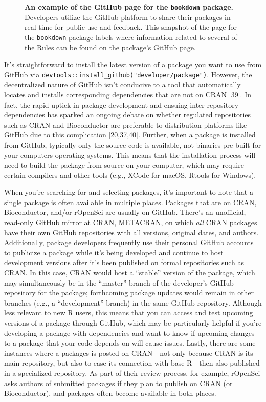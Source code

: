 \documentclass[10pt,letterpaper]{article}
\begin{document}
\begin{figure}[!h]
\caption{{\bf An example of the GitHub page for the \texttt{bookdown} package.}
Developers utilize the GitHub platform to share their packages in real-time for public use and feedback. This snapshot of the page for the \texttt{bookdown} package labels where information related to several of the Rules can be found on the package's GitHub page.}
\label{fig6}
\end{figure}

It's straightforward to install the latest version of a package you want
to use from GitHub via
\texttt{devtools::install\_github("developer/package")}. However, the
decentralized nature of GitHub isn't conducive to a tool that
automatically locates and installs corresponding dependencies that are
not on CRAN {[}39{]}. In fact, the rapid uptick in package development
and ensuing inter-repository dependencies has sparked an ongoing debate
on whether regulated repositories such as CRAN and Bioconductor are
preferable to distribution platforms like GitHub due to this
complication {[}20,37,40{]}. Further, when a package is installed from
GitHub, typically only the source code is available, not binaries
pre-built for your computers operating systems. This means that the
installation process will need to build the package from source on your
computer, which may require certain compilers and other tools (e.g.,
XCode for macOS, Rtools for Windows).

When you're searching for and selecting packages, it's important to note
that a single package is often available in multiple places. Packages
that are on CRAN, Bioconductor, and/or rOpenSci are usually on GitHub.
There's an unofficial, read-only GitHub mirror at CRAN,
\href{https://github.com/cran}{METACRAN}, on which \emph{all} CRAN
packages have their own GitHub repositories with all versions, original
dates, and authors. Additionally, package developers frequently use
their personal GitHub accounts to publicize a package while it's being
developed and continue to host development versions after it's been
published on formal repositories such as CRAN. In this case, CRAN would
host a ``stable'' version of the package, which may simultaneously be in
the ``master'' branch of the developer's GitHub repository for the
package; forthcoming package updates would remain in other branches
(e.g., a ``development'' branch) in the same GitHub repository. Although
less relevant to new R users, this means that you can access and test
upcoming versions of a package through GitHub, which may be particularly
helpful if you're developing a package with dependencies and want to
know if upcoming changes to a package that your code depends on will
cause issues. Lastly, there are some instances where a packages is
posted on CRAN---not only because CRAN is its main repository, but also
to ease its connection with base R---then also published in a
specialized repository. As part of their review process, for example,
rOpenSci asks authors of submitted packages if they plan to publish on
CRAN (or Bioconductor), and packages often become available in both
places.
\end{document}
